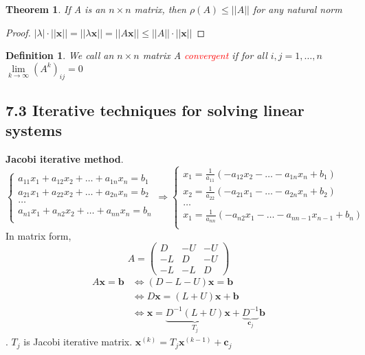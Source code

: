 \documentclass[11pt]{article}
\newtheorem{theorem}{Theorem}[section]
\newtheorem{definition}{Definition}[section]
\newcommand{\bl}[1] {\boldsymbol{#1}}
\begin{document}
\begin{theorem}
If A is an $n\times n$ matrix, then $\rho(A)\le||A||$ for any natural norm
\end{theorem}

\begin{proof}
$|\lambda|\cdot||\bl{x}||=||\lambda\bl{x}||=||A\bl{x}||\le||A||\cdot||\bl{x}||$
\end{proof}

\begin{definition}
We call an $n\times n$ matrix A \textcolor{red}{convergent} if for all $i,j=1,\dots,n$
$\lim\limits_{k\to\infty}(A^k)_{ij}=0$
\end{definition}
\subsection{7.3 Iterative techniques for solving linear systems}
\label{sec:orgc24bca8}
\textbf{Jacobi iterative method}.
\begin{equation*}
\begin{cases}
a_{11}x_1+a_{12}x_2+\dots+a_{1n}x_n=b_1\\
a_{21}x_1+a_{22}x_2+\dots+a_{2n}x_n=b_2\\
\dots\\
a_{n1}x_1+a_{n2}x_2+\dots+a_{nn}x_n=b_n\\
\end{cases}\Longrightarrow
\begin{cases}
x_1=\frac{1}{a_{11}}(-a_{12}x_2-\dots-a_{1n}x_n+b_1)\\
x_2=\frac{1}{a_{22}}(-a_{21}x_1-\dots-a_{2n}x_n+b_2)\\
\dots\\
x_1=\frac{1}{a_{nn}}(-a_{n2}x_1-\dots-a_{nn-1}x_{n-1}+b_n)\\
\end{cases}
\end{equation*}
In matrix form, 
\begin{equation*}
A=
\begin{pmatrix}
D&-U&-U\\
-L&D&-U\\
-L&-L&D
\end{pmatrix}
\end{equation*}
\begin{align*}
A\bl{x}=\bl{b}&\Leftrightarrow(D-L-U)\bl{x}=\bl{b}\\
&\Leftrightarrow D\bl{x}=(L+U)\bl{x}+\bl{b}\\
&\Leftrightarrow \bl{x}=\underbrace{D^{-1}(L+U)}_{T_j}\bl{x}+\underbrace{D^{-1}}_{\bl{c}_j}\bl{b}
\end{align*}.
\(T_j\) is Jacobi iterative matrix. \(\bl{x}^{(k)}=T_j\bl{x}^{(k-1)}+\bl{c}_j\)
\end{document}
